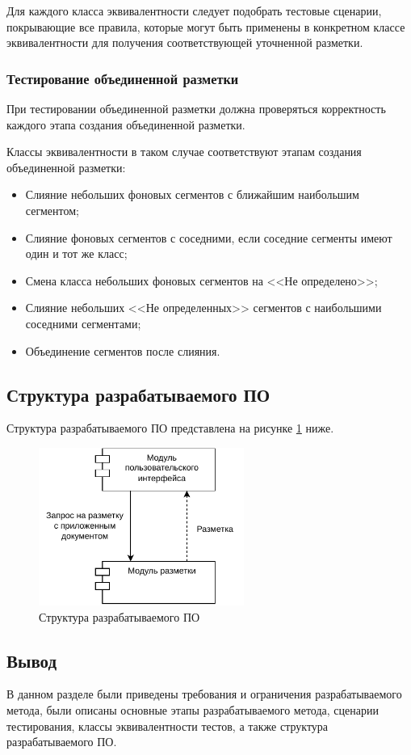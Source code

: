Для каждого класса эквивалентности следует подобрать тестовые сценарии, покрывающие все правила, которые могут быть применены в конкретном классе эквивалентности для получения соответствующей уточненной разметки.

\subsubsection{Тестирование объединенной разметки}

При тестировании объединенной разметки должна проверяться корректность каждого этапа создания объединенной разметки.

Классы эквивалентности в таком случае соответствуют этапам создания объединенной разметки:
\begin{itemize}
    \item Слияние небольших фоновых сегментов с ближайшим наибольшим сегментом;
    \item Слияние фоновых сегментов с соседними, если соседние сегменты имеют один и тот же класс;
    \item Смена класса небольших фоновых сегментов на <<Не определено>>;
    \item Слияние небольших <<Не определенных>> сегментов с наибольшими соседними сегментами;
    \item Объединение сегментов после слияния.
\end{itemize}

\subsection{Структура разрабатываемого ПО}

Структура разрабатываемого ПО представлена на рисунке \ref{fig:components} ниже.

\begin{figure}[H]
	\centering
	\includegraphics[width=0.6\textwidth]{diag/components.pdf}
	\caption{Структура разрабатываемого ПО}
	\label{fig:components}
\end{figure}

\subsection*{Вывод}

В данном разделе были приведены требования и ограничения разрабатываемого метода, были описаны основные этапы разрабатываемого метода, сценарии тестирования, классы эквивалентности тестов, а также структура разрабатываемого ПО.

